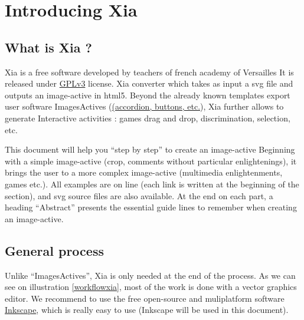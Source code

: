 


 
 \tableofcontents
 
 
\section{Introducing Xia}

\subsection{What is Xia ?}

Xia is a free software developed by teachers of french academy of Versailles
It is released under \href{http://www.gnu.org/copyleft/gpl.html}{GPLv3} license.
Xia converter which takes as input a svg file and outputs an image-active in 
html5. Beyond the already known templates export user software ImagesActives 
(\href{http://images-actives.crdp-versailles.fr/spip.php?article11\&lang=fr}
{(accordion, buttons, etc.}), Xia further allows to generate
Interactive activities : games drag and drop, discrimination, selection, etc.

This document will help you ``step by step'' to create an image-active
Beginning with a simple image-active (crop, comments without particular 
enlightenings), it brings the user to a more complex image-active (multimedia
 enlightenments, games etc.). All examples are on line (each link is written at 
the beginning of the section), and svg source files are also available. At the end
on each part, a heading ``Abstract'' presents the essential guide lines to 
remember when creating an image-active.

\subsection{General process}

Unlike ``ImagesActives'', Xia is only needed at the end of the process.
As we can see on illustration \ref{workflowxia}, most of the work is done with 
a  vector graphics editor. We recommend to use the free open-source and 
muliplatform software \href{http://www.inkscape.org/}{Inkscape}, which is 
really easy to use (Inkscape will be used in this document).

